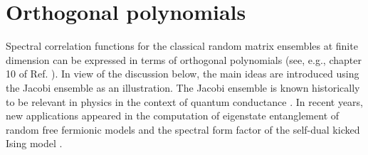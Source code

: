\documentclass[aps, notitlepage, floatfix, pre, twocolumn]{revtex4-2}
\begin{document}
\section{Orthogonal polynomials} \label{sec: polynomials}
Spectral correlation functions for the classical random matrix ensembles at finite dimension can be expressed in terms of orthogonal polynomials (see, e.g., chapter 10 of Ref. \cite{Livan18}). In view of the discussion below, the main ideas are introduced using the Jacobi ensemble as an illustration. The Jacobi ensemble is known historically to be relevant in physics in the context of quantum conductance \cite{Forrester06}. In recent years, new applications appeared in the computation of eigenstate entanglement of random free fermionic models \cite{Liu18, Lydzba21, Bianchi21, Murciano22, Ulcakar22} and the spectral form factor of the self-dual kicked Ising model \cite{Flack20}.
\end{document}
